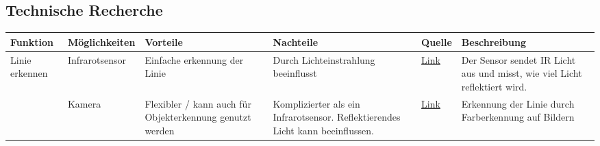 \documentclass{article}
\begin{document}
\begin{landscape} %
	\section{Technische Recherche}
	\renewcommand*{\arraystretch}{1.8}
	\begin{longtable}{>{\raggedright\arraybackslash}m{3cm}>{\raggedright\arraybackslash}m{3cm}>{\raggedright\arraybackslash}m{5cm}>{\raggedright\arraybackslash}m{5cm}>{\raggedright\centering\arraybackslash}m{1cm}>{\raggedright\arraybackslash}m{7cm}}		
		\textbf{Funktion}               & \textbf{Möglichkeiten} & \textbf{Vorteile}                                                                                & \textbf{Nachteile}                                                             & \textbf{Quelle}                                                                                              & \textbf{Beschreibung}                                                                                                                                                                                                                                                                                                                                                                                                                                                                     \\
		\hline
		Linie erkennen                    & Infrarotsensor          & Einfache erkennung der Linie                                                                     & Durch Lichteinstrahlung beeinflusst                                            & \href{https://www.futurelearn.com/info/courses/robotics-with-raspberry-pi/0/steps/75899}{Link}               & Der Sensor sendet IR Licht aus und misst, wie viel Licht reflektiert wird.                                                                                                                                                                                                                                                                                                                                                                                                                \\
		\cline{2-6}
										& Kamera                  & Flexibler / kann auch für Objekterkennung genutzt werden                                        & Komplizierter als ein Infrarotsensor. Reflektierendes Licht kann beeinflussen. & \href{https://www.instructables.com/Line-Following-Robot-Using-Smartphones-Camera/}{Link}                    & Erkennung der Linie durch Farberkennung auf Bildern                                                                                                                                                                                                                                                                                                                                                                                                                                       \\

\end{longtable}
\end{landscape}
\end{document}
